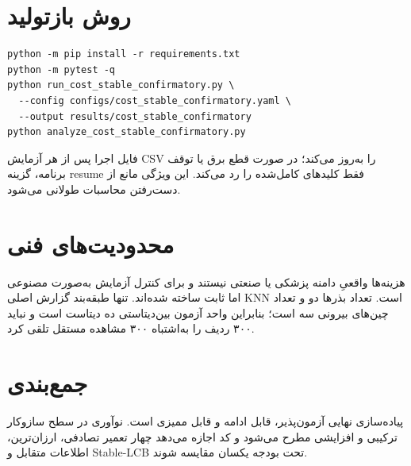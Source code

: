 \documentclass[12pt,a4paper]{article}
\newcommand{\lr}[1]{\foreignlanguage{english}{#1}}
\newenvironment{latin}{\begin{otherlanguage}{english}}{\end{otherlanguage}}
\begin{document}
\section{روش بازتولید}
\begin{latin}\begin{lstlisting}[numbers=none]
python -m pip install -r requirements.txt
python -m pytest -q
python run_cost_stable_confirmatory.py \
  --config configs/cost_stable_confirmatory.yaml \
  --output results/cost_stable_confirmatory
python analyze_cost_stable_confirmatory.py
\end{lstlisting}\end{latin}
فایل اجرا پس از هر آزمایش CSV را به‌روز می‌کند؛ در صورت قطع برق یا توقف برنامه، گزینه \lr{resume} فقط کلیدهای کامل‌شده را رد می‌کند. این ویژگی مانع از دست‌رفتن محاسبات طولانی می‌شود.

\section{محدودیت‌های فنی}
هزینه‌ها واقعیِ دامنه پزشکی یا صنعتی نیستند و برای کنترل آزمایش به‌صورت مصنوعی اما ثابت ساخته شده‌اند. تنها طبقه‌بند گزارش اصلی KNN است. تعداد بذرها دو و تعداد چین‌های بیرونی سه است؛ بنابراین واحد آزمون بین‌دیتاستی ده دیتاست است و نباید ۳۰۰ ردیف را به‌اشتباه ۳۰۰ مشاهده مستقل تلقی کرد.

\section{جمع‌بندی}
پیاده‌سازی نهایی آزمون‌پذیر، قابل ادامه و قابل ممیزی است. نوآوری در سطح سازوکار ترکیبی و افزایشی مطرح می‌شود و کد اجازه می‌دهد چهار تعمیر تصادفی، ارزان‌ترین، اطلاعات متقابل و \lr{Stable-LCB} تحت بودجه یکسان مقایسه شوند.
\end{document}

